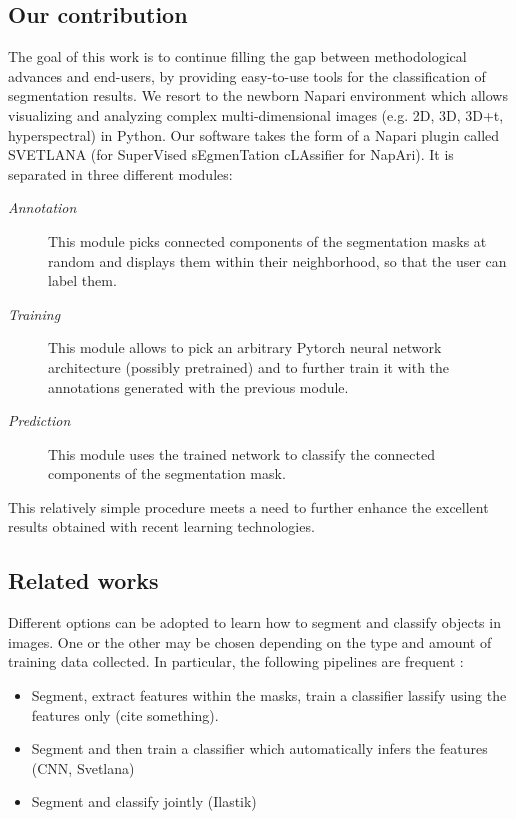 \documentclass{article}
\begin{document}
\subsection{Our contribution}

The goal of this work is to continue filling the gap between methodological advances and end-users, by providing easy-to-use tools for the classification of segmentation results. 
We resort to the newborn Napari environment \cite{perkel2021python} which allows visualizing and analyzing complex multi-dimensional images (e.g. 2D, 3D, 3D+t, hyperspectral) in Python.
Our software takes the form of a Napari plugin called SVETLANA (for SuperVised sEgmenTation cLAssifier for NapAri). 
It is separated in three different modules: 
\begin{description}
  \item[\emph{Annotation}] This module picks connected components of the segmentation masks at random and displays them within their neighborhood, so that the user can label them.
  \item[\emph{Training}] This module allows to pick an arbitrary Pytorch \cite{paszke2019pytorch} neural network architecture (possibly pretrained) and to further train it with the annotations generated with the previous module.
  \item[\emph{Prediction}] This module uses the trained network to classify the connected components of the segmentation mask.
\end{description}
This relatively simple procedure meets a need to further enhance the excellent results obtained with recent learning technologies.

\subsection{Related works}

Different options can be adopted to learn how to segment and classify objects in images. 
One or the other may be chosen depending on the type and amount of training data collected.
In particular, the following pipelines are frequent :
\begin{itemize}
  \item Segment, extract features within the masks, train a classifier lassify using the features only (cite something).
  \item Segment and then train a classifier which automatically infers the features (CNN, Svetlana)
  \item Segment and classify jointly (Ilastik)
\end{itemize}
\end{document}
